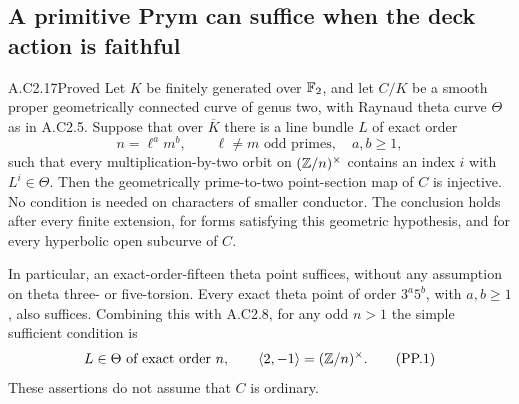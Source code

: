 \subsection{A primitive Prym can suffice when the deck action is faithful}

\begin{claim}{A.C2.17}{Proved}
Let $K$ be finitely generated over $\mathbb F_2$, and let $C/K$ be a
smooth proper geometrically connected curve of genus two, with
Raynaud theta curve $\Theta$ as in A.C2.5. Suppose that over
$\overline K$ there is a line bundle $L$ of exact order
\[
 n=\ell^a m^b,\qquad
 \ell\ne m\text{ odd primes},\quad a,b\ge1,
\]
such that every multiplication-by-two orbit on
$(\mathbb Z/n)^\times$ contains an index $i$ with $L^i\in\Theta$.
Then the geometrically prime-to-two point-section map of $C$
is injective. No condition is needed on characters of smaller
conductor. The conclusion holds after every finite extension,
for forms satisfying this geometric hypothesis, and for every
hyperbolic open subcurve of $C$.

In particular, an exact-order-fifteen theta point suffices,
without any assumption on theta three- or five-torsion.
Every exact theta point of order $3^a5^b$, with $a,b\ge1$,
also suffices. Combining this with A.C2.8, for any odd $n>1$
the simple sufficient condition is
\[
 L\in\Theta\text{ of exact order }n,\qquad
             \langle2,-1\rangle=(\mathbb Z/n)^\times.             \tag{PP.1}
\]
These assertions do not assume that $C$ is ordinary.
\end{claim}
